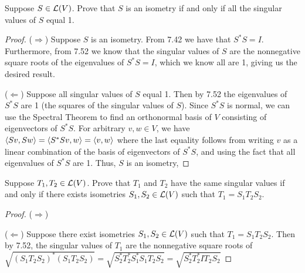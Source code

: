 \begin{exercise}{15}
  Suppose $S\in\mathcal{L}(V)$. Prove that $S$ is an isometry if and only if all  the singular values of $S$ equal 1.
\end{exercise}
\begin{proof}
 ($\Rightarrow$) Suppose $S$ is an isometry. From 7.42 we have that $S^\ast S =I$. Furthermore, from 7.52 we know that the singular values of $S$ are the nonnegative square roots of the eigenvalues of $S^\ast S =I$, which we know all are 1, giving us the desired result.

 ($\Leftarrow$) Suppose all singular values of $S$ equal 1. Then by 7.52 the eigenvalues of $S^\ast S$ are 1 (the squares of the singular values of $S$). Since $S^\ast S$ is normal, we can use the Spectral Theorem to find an orthonormal basis of $V$ consisting of eigenvectors of $S^\ast S$. For arbitrary $v,w\in V$, we have $\langle Sv,Sw\rangle =\langle S^\ast Sv,w\rangle =\langle v,w\rangle$ where the last equality follows from writing $v$ as a linear combination of the basis of eigenvectors of $S^\ast S$, and using the fact that all eigenvalues of $S^\ast S$ are 1. Thus, $S$ is an isometry,
\end{proof}

\begin{exercise}{16}
  Suppose $T_1,T_2\in\mathcal{L}(V)$. Prove that $T_1$ and $T_2$ have the same singular values if and only if there exists isometries $S_1,S_2\in\mathcal{L}(V)$ such that $T_1 =S_1T_2S_2$.
\end{exercise}
\begin{proof}
 ($\Rightarrow$)

 ($\Leftarrow$) Suppose there exist isometries $S_1,S_2\in\mathcal{L}(V)$ such that $T_1 =S_1T_2S_2$. Then by 7.52, the singular values of $T_1$ are the nonnegative square roots of $\sqrt{(S_1T_2S_2)^\ast(S_1T_2S_2)} =\sqrt{S_2^\ast T_2^\ast S_1^\ast S_1T_2S_2} =\sqrt{S_2^\ast T_2^\ast IT_2S_2}$
\end{proof}

